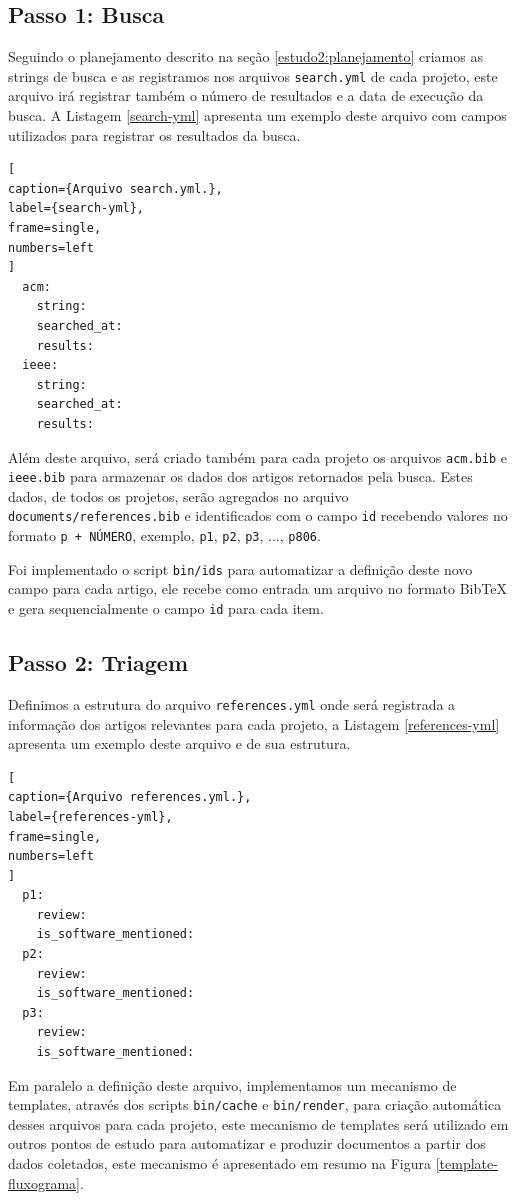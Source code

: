 \subsection{Passo 1: Busca}

Seguindo o planejamento descrito na seção \ref{estudo2:planejamento} criamos as
strings de busca e as registramos nos arquivos \texttt{search.yml} de cada
projeto, este arquivo irá registrar também o número de resultados e a data de
execução da busca. A Listagem \ref{search-yml} apresenta um exemplo deste
arquivo com campos utilizados para registrar os resultados da busca.

\begin{lstlisting}[
caption={Arquivo search.yml.},
label={search-yml},
frame=single,
numbers=left
]
  acm:
    string:
    searched_at:
    results:
  ieee:
    string:
    searched_at:
    results:
\end{lstlisting}

Além deste arquivo, será criado também para cada projeto os arquivos
\texttt{acm.bib} e \texttt{ieee.bib} para armazenar os dados dos artigos
retornados pela busca. Estes dados, de todos os projetos, serão agregados no
arquivo \texttt{documents/references.bib} e identificados com
o campo \texttt{id} recebendo valores no formato \texttt{p + NÚMERO},
exemplo, \texttt{p1}, \texttt{p2}, \texttt{p3}, ..., \texttt{p806}.

Foi implementado o script \texttt{bin/ids} para automatizar a
definição deste novo campo para cada artigo, ele recebe como entrada um arquivo
no formato BibTeX e gera sequencialmente o campo \texttt{id} para cada item.

\subsection{Passo 2: Triagem}

Definimos a estrutura do arquivo \texttt{references.yml} onde será registrada a
informação dos artigos relevantes para cada projeto, a Listagem
\ref{references-yml} apresenta um exemplo deste arquivo e de sua estrutura.

\begin{lstlisting}[
caption={Arquivo references.yml.},
label={references-yml},
frame=single,
numbers=left
]
  p1:
    review:
    is_software_mentioned:
  p2:
    review:
    is_software_mentioned:
  p3:
    review:
    is_software_mentioned:
\end{lstlisting}

Em paralelo a definição deste arquivo, implementamos um mecanismo de templates,
através dos scripts \texttt{bin/cache} e \texttt{bin/render}, para criação
automática desses arquivos para cada projeto, este mecanismo de templates será
utilizado em outros pontos de estudo para automatizar e produzir documentos a
partir dos dados coletados, este mecanismo é apresentado em resumo na Figura
\ref{template-fluxograma}.


